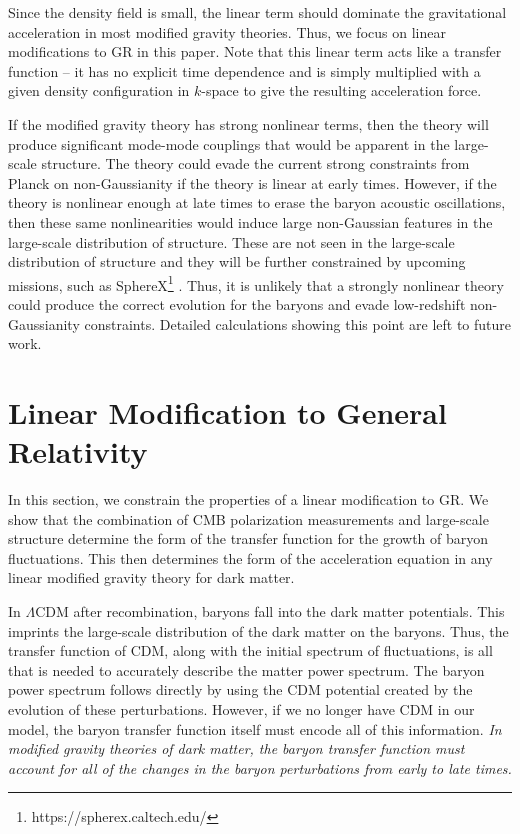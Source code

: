 \documentclass[12pt,floats,floatfix,showpacs,amssymb,amsmath,prl,superscriptaddress,nofootinbib, aps]{revtex4-2}
\begin{document}
Since the density field is small, the linear term should dominate the gravitational acceleration in most modified gravity theories. Thus, we focus on linear modifications to GR in this paper. Note that this linear term acts like a transfer function -- it has no explicit time dependence and is simply multiplied with a given density configuration in $k$-space to give the resulting acceleration force.

If the modified gravity theory has strong nonlinear terms, then the theory will produce significant mode-mode couplings that would be apparent in the large-scale structure. The theory could evade the current strong constraints from Planck on non-Gaussianity \citep{PlanckIX} if the theory is linear at early times. However, if the theory is nonlinear enough at late times to erase the baryon acoustic oscillations, then these same nonlinearities would induce large non-Gaussian features in the large-scale distribution of structure. These are not seen in the large-scale distribution of structure \citep{Slosar2008} and they will be further constrained by upcoming missions, such as SphereX\footnote{https://spherex.caltech.edu/} \citep{Dore2014}. Thus, it is unlikely that a strongly nonlinear theory could produce the correct evolution for the baryons and evade low-redshift non-Gaussianity constraints. Detailed calculations showing this point are left to future work.

\section{Linear Modification to General Relativity\label{sec:linear}}

In this section, we constrain the properties of a linear modification to GR. We show that the combination of CMB polarization measurements and large-scale structure determine the form of the transfer function for the growth of baryon fluctuations. This then determines the form of the acceleration equation in any linear modified gravity theory for dark matter.

In $\Lambda$CDM after recombination, baryons fall into the dark matter potentials. This imprints the large-scale distribution of the dark matter on the baryons. Thus, the transfer function of CDM, along with the initial spectrum of fluctuations, is all that is needed to accurately describe the matter power spectrum. The baryon power spectrum follows directly by using the CDM potential created by the evolution of these perturbations. However, if we no longer have CDM in our model, the baryon transfer function itself must encode all of this information. \textit{In modified gravity theories of dark matter, the baryon transfer function must account for all of the changes in the baryon perturbations from early to late times.}
\end{document}
